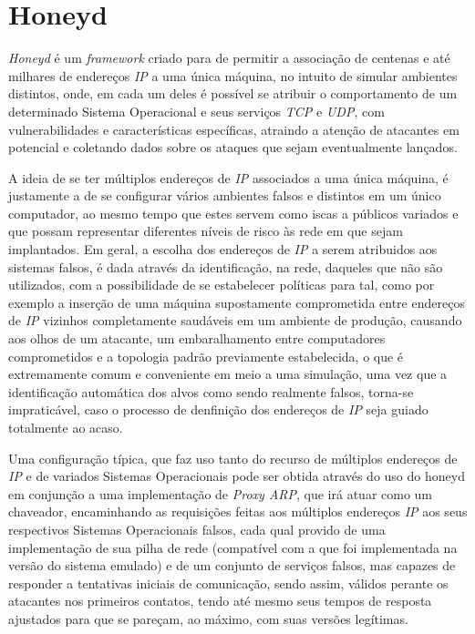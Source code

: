 \section{Honeyd}

\textit{Honeyd} é um \textit{framework} criado para de permitir a associação de centenas e até milhares de endereços \textit{IP} a uma única máquina, no intuito de simular ambientes distintos, onde, em cada um deles é possível se atribuir o comportamento de um determinado Sistema Operacional e seus serviços \textit{TCP} e \textit{UDP}, com vulnerabilidades e características específicas, atraindo a atenção de atacantes em potencial e coletando dados sobre os ataques que sejam eventualmente lançados. \cite{VirtualHoneypots}

A ideia de se ter múltiplos endereços de \textit{IP} associados a uma única máquina, é justamente a de se configurar vários ambientes falsos e distintos em um único computador, ao mesmo tempo que estes servem como iscas a públicos variados e que possam representar diferentes níveis de risco às rede em que sejam implantados. Em geral, a escolha dos endereços de \textit{IP} a serem atribuidos aos sistemas falsos, é dada através da identificação, na rede, daqueles que não são utilizados, com a possibilidade de se estabelecer políticas para tal, como por exemplo a inserção de uma máquina supostamente comprometida entre endereços de \textit{IP} vizinhos completamente saudáveis em um ambiente de produção, causando aos olhos de um atacante, um embaralhamento entre computadores comprometidos e a topologia padrão previamente estabelecida, o que é extremamente comum e conveniente em meio a uma simulação, uma vez que a identificação automática dos alvos como sendo realmente falsos, torna-se impraticável, caso o processo de denfinição dos endereços de \textit{IP} seja guiado totalmente ao acaso.

Uma configuração típica, que faz uso tanto do recurso de múltiplos endereços de \textit{IP} e de variados Sistemas Operacionais pode ser obtida através do uso do honeyd em conjunção a uma implementação de \textit{Proxy ARP}, que irá atuar como um chaveador, encaminhando as requisições feitas aos múltiplos endereços \textit{IP} aos seus respectivos Sistemas Operacionais falsos, cada qual provido de uma implementação de sua pilha de rede (compatível com a que foi implementada na versão do sistema emulado) e de um conjunto de serviços falsos, mas capazes de responder a tentativas iniciais de comunicação, sendo assim, válidos perante os atacantes nos primeiros contatos, tendo até mesmo seus tempos de resposta ajustados para que se pareçam, ao máximo, com suas versões legítimas.

